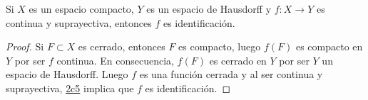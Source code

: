 

\begin{theorem}
Si $X$ es un espacio compacto, $Y$ es un espacio de Hausdorff y $f : X \longrightarrow Y$ es continua y suprayectiva, entonces $f$ es identificación.
\end{theorem}

\begin{proof}
Si $F \subset X$ es cerrado, entonces $F$ es compacto, luego $f(F)$ es compacto en $Y$ por ser $f$ continua. En consecuencia, $f(F)$ es cerrado en $Y$ por ser $Y$ un espacio de Hausdorff. Luego $f$ es una función cerrada y al ser continua y suprayectiva, \hyperref[card:2c5]{\textsf{2c5}} implica que $f$ es identificación.
\end{proof}
